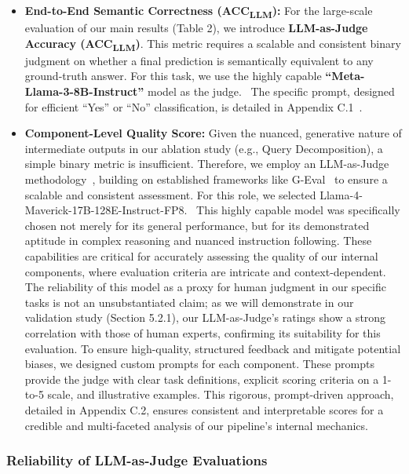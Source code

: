 \documentclass[11pt]{article}
\begin{document}
\begin{itemize}
    \item \textbf{End-to-End Semantic Correctness (ACC\textsubscript{LLM}):} For the large-scale evaluation of our main results (Table 2), we introduce \textbf{LLM-as-Judge Accuracy (ACC\textsubscript{LLM})}. This metric requires a scalable and consistent binary judgment on whether a final prediction is semantically equivalent to any ground-truth answer. For this task, we use the highly capable \textbf{``Meta-Llama-3-8B-Instruct''} model as the judge.~\cite{meta2024llama3} The specific prompt, designed for efficient ``Yes'' or ``No'' classification, is detailed in Appendix C.1~\cite{vicuna2023,Zheng2023Judging}.
    
    \item \textbf{Component-Level Quality Score:} Given the nuanced, generative nature of intermediate outputs in our ablation study (e.g., Query Decomposition), a simple binary metric is insufficient. Therefore, we employ an LLM-as-Judge methodology~\cite{Zheng2023Judging}, building on established frameworks like G-Eval~\cite{liu2023gevalnlgevaluationusing} to ensure a scalable and consistent assessment. For this role, we selected Llama-4-Maverick-17B-128E-Instruct-FP8.~\cite{meta2025llama4} This highly capable model was specifically chosen not merely for its general performance, but for its demonstrated aptitude in complex reasoning and nuanced instruction following. These capabilities are critical for accurately assessing the quality of our internal components, where evaluation criteria are intricate and context-dependent. The reliability of this model as a proxy for human judgment in our specific tasks is not an unsubstantiated claim; as we will demonstrate in our validation study (Section 5.2.1), our LLM-as-Judge's ratings show a strong correlation with those of human experts, confirming its suitability for this evaluation. To ensure high-quality, structured feedback and mitigate potential biases, we designed custom prompts for each component. These prompts provide the judge with clear task definitions, explicit scoring criteria on a 1-to-5 scale, and illustrative examples. This rigorous, prompt-driven approach, detailed in Appendix C.2, ensures consistent and interpretable scores for a credible and multi-faceted analysis of our pipeline's internal mechanics.
\end{itemize}

\subsubsection{Reliability of LLM-as-Judge Evaluations}
\end{document}
